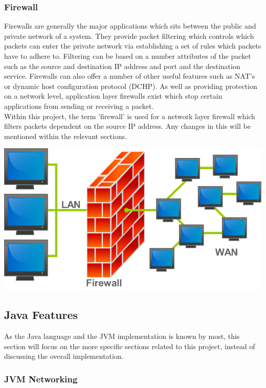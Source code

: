 \documentclass[a4paper, titlepage]{article}
\begin{document}
\subsubsection{Firewall}
Firewalls are generally the major applications which sits between the public and private network of a system. They provide packet filtering which controls which packets can enter the private network via establishing a set of rules which packets have to adhere to. Filtering can be based on a number attributes of the packet such as the source and destination IP address and port and the destination service. Firewalls can also offer a number of other useful features such as NAT's or dynamic host configuration protocol (DCHP). As well as providing protection on a network level, application layer firewalls exist which stop certain applications from sending or receiving a packet. \\
\newline
Within this project, the term 'firewall' is used for a network layer firewall which filters packets dependent on the source IP address. Any changes in this will be mentioned within the relevant sections.

\includegraphics[width=\textwidth]{images/firewall.png}

\subsection{Java Features}
As the Java language and the JVM implementation is known by most, this section will focus on the more specific sections related to this project, instead of discussing the overall implementation.

\subsubsection{JVM Networking}
\end{document}
